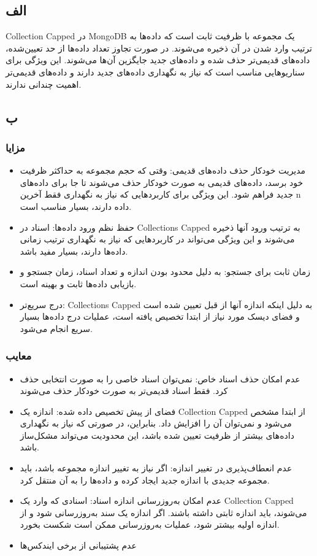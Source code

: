 \subsection*{الف}
Collection Capped در MongoDB یک مجموعه با ظرفیت ثابت است که داده‌ها به ترتیب وارد شدن در آن ذخیره می‌شوند. در صورت تجاوز تعداد داده‌ها از حد تعیین‌شده، داده‌های قدیمی‌تر حذف شده و داده‌های جدید جایگزین آن‌ها می‌شوند. این ویژگی برای سناریوهایی مناسب است که نیاز به نگهداری داده‌های جدید دارند و داده‌های قدیمی‌تر اهمیت چندانی ندارند.
\subsection*{ب}

\subsubsection*{مزایا}
\begin{itemize}
	\item مدیریت خودکار حذف داده‌های قدیمی:
	وقتی که حجم مجموعه به حداکثر ظرفیت خود برسد، داده‌های قدیمی به صورت خودکار حذف می‌شوند تا جا برای داده‌های جدید فراهم شود. این ویژگی برای کاربردهایی که نیاز به نگهداری فقط آخرین n داده دارند، بسیار مناسب است.
	\item حفظ نظم ورود داده‌ها:
	اسناد در Collections Capped به ترتیب ورود آنها ذخیره می‌شوند و این ویژگی می‌تواند در کاربردهایی که نیاز به نگهداری ترتیب زمانی داده‌ها دارند، بسیار مفید باشد.
	\item زمان ثابت برای جستجو:
	به دلیل محدود بودن اندازه و تعداد اسناد، زمان جستجو و بازیابی داده‌ها ثابت و بهینه است.
	\item درج سریع‌تر:
	Collections Capped به دلیل اینکه اندازه آنها از قبل تعیین شده است و فضای دیسک مورد نیاز از ابتدا تخصیص یافته است، عملیات درج داده‌ها بسیار سریع انجام می‌شود.
\end{itemize}
\subsubsection*{معایب}
\begin{itemize}
	\item عدم امکان حذف اسناد خاص:
	نمی‌توان اسناد خاصی را به صورت انتخابی حذف کرد. فقط اسناد قدیمی‌تر به صورت خودکار حذف می‌شوند
	\item فضای از پیش تخصیص داده شده:
	اندازه یک Collection Capped از ابتدا مشخص می‌شود و نمی‌توان آن را افزایش داد. بنابراین، در صورتی که نیاز به نگهداری داده‌های بیشتر از ظرفیت تعیین شده باشد، این محدودیت می‌تواند مشکل‌ساز باشد.
	\item عدم انعطاف‌پذیری در تغییر اندازه: 
	اگر نیاز به تغییر اندازه مجموعه باشد، باید مجموعه جدیدی با اندازه جدید ایجاد کرده و داده‌ها را به آن منتقل کرد.
	\item عدم امکان به‌روزرسانی اندازه اسناد:
	اسنادی که وارد یک Collection Capped می‌شوند، باید اندازه ثابتی داشته باشند. اگر اندازه یک سند به‌روزرسانی شود و از اندازه اولیه بیشتر شود، عملیات به‌روزرسانی ممکن است شکست بخورد.
	\item عدم پشتیبانی از برخی ایندکس‌ها
\end{itemize}
\pagebreak
